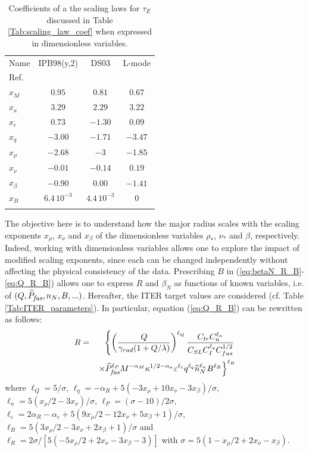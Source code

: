 \documentclass[12pt]{iopart}
\newcommand{\hatPfus}{{\widehat{P}_{\textrm{\it\footnotesize fus}}}}
\begin{document}
\begin{table}
	\caption{\label{Tab:scaling_law_coef_dimensionless} Coefficients of a the scaling laws for $\tau_E$ discussed in Table \ref{Tab:scaling_law_coef} when expressed in dimensionless variables.}
	\begin{indented}
		\item[]\begin{tabular}{@{}lccc}
			\br
			Name & IPB98(y,2) & DS03 & L-mode
			\\ 
			Ref. & \cite[eq.(20)]{ITERphysics_chap2} & \cite{Sips2018} & \cite[eq.(24)]{ITERphysics_chap2}
			\\ \br
			$x_M$ & $0.95$ & $0.81$ & $0.67$ \\ \mr
			$x_\kappa$ & $3.29$ & $2.29$ & $3.22$ \\ \mr 
			$x_\epsilon$ & $0.73$ & $-1.30$ & $0.09$ \\ \mr
			$x_q$ & $-3.00$ & $-1.71$ & $-3.47$ \\ \mr
			$x_\rho$ & $-2.68$ & $-3$ & $-1.85$ \\ \mr 
			$x_\nu$ & $-0.01$ & $-0.14$ & $0.19$ \\ \mr 
			$x_\beta$ & $-0.90$ & $0.00$ & $-1.41$ \\ \mr 
			$x_B$ & $6.4\, 10^{-3}$ & $4.4\, 10^{-3}$ & $0$ \\ \br
		\end{tabular}
	\end{indented}
\end{table}

The objective here is to understand how the major radius scales with the scaling exponents $x_\rho$, $x_\nu$ and $x_\beta$ of the dimensionless variables $\rho_*$, $\nu_*$ and $\beta$, respectively.
Indeed, working with dimensionless variables allows one to explore the impact of modified scaling exponents, since each can be changed independently without affecting the physical consistency of the data. Prescribing $B$ in (\ref{eq:betaN_R_B}-\ref{eq:Q_R_B}) allows one to express $R$ and $\beta_N$ as functions of known variables, i.e. of $(Q, \hatPfus, n_N, B, ...)$. Hereafter, the ITER target values are considered (cf. Table \ref{Tab:ITER_parameters}). In particular, equation  (\ref{eq:Q_R_B}) can be rewritten as follows:
\begin{eqnarray}
  R &=& \left\{ \left( \frac{Q}{\gamma_{rad}(1+Q/\lambda)} \right)^{\ell_Q} 
  \frac{ C_{tr} C_n^{\ell_n} }{ C_{SL} C_I^{\ell_q} C_{fus}^{1/2} }
  \right. \nonumber \\
  &&\left. \times
  \hatPfus^{\ell_P} M^{-\alpha_M}
  \kappa^{1/2-\alpha_\kappa} \varepsilon^{\ell_\varepsilon} 
  q^{\ell_q} \widehat n_N^{\ell_n} B^{\ell_B}
  \right\}^{\ell_R}
\end{eqnarray}
where
$\ell_Q = 5/\sigma$, 
$\ell_q = -\alpha_R+ 5(-3x_\rho +10x_\nu -3x_\beta)/\sigma$, 
$\ell_n = 5(x_\rho/2 -3x_\nu)/\sigma$,
$\ell_P = (\sigma-10)/2\sigma$,
$\ell_\varepsilon = 2\alpha_R-\alpha_\varepsilon + 5(9x_\rho/2 -12x_\nu +5x_\beta+1)/\sigma$,
$\ell_B = 5(3x_\rho/2 -3x_\nu +2x_\beta+1)/\sigma$
and $\ell_R = 2\sigma /[5(-5x_\rho/2 +2x_\nu -3x_\beta -3)]$
with $\sigma = 5(1 -x_\rho/2 +2x_\nu -x_\beta)$.
\end{document}
